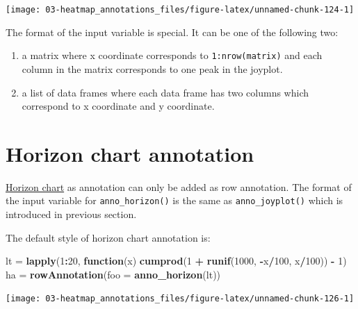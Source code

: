 \documentclass[]{book}
\newenvironment{Shaded}{\begin{snugshade}}{\end{snugshade}}
\newcommand{\KeywordTok}[1]{\textcolor[rgb]{0.13,0.29,0.53}{\textbf{#1}}}
\newcommand{\DataTypeTok}[1]{\textcolor[rgb]{0.13,0.29,0.53}{#1}}
\newcommand{\DecValTok}[1]{\textcolor[rgb]{0.00,0.00,0.81}{#1}}
\newcommand{\StringTok}[1]{\textcolor[rgb]{0.31,0.60,0.02}{#1}}
\newcommand{\ControlFlowTok}[1]{\textcolor[rgb]{0.13,0.29,0.53}{\textbf{#1}}}
\newcommand{\OperatorTok}[1]{\textcolor[rgb]{0.81,0.36,0.00}{\textbf{#1}}}
\newcommand{\NormalTok}[1]{#1}
\providecommand{\tightlist}{%
  \setlength{\itemsep}{0pt}\setlength{\parskip}{0pt}}
\theoremstyle{definition}
\theoremstyle{definition}
\theoremstyle{definition}
\theoremstyle{remark}
\begin{document}
\begin{center}\texttt{[image: 03-heatmap\_annotations\_files/figure-latex/unnamed-chunk-124-1]} \end{center}

The format of the input variable is special. It can be one of the
following two:

\begin{enumerate}
\def\labelenumi{\arabic{enumi}.}
\tightlist
\item
  a matrix where x coordinate corresponds to \texttt{1:nrow(matrix)} and
  each column in the matrix corresponds to one peak in the joyplot.
\item
  a list of data frames where each data frame has two columns which
  correspond to x coordinate and y coordinate.
\end{enumerate}

\section{Horizon chart annotation}\label{horizon-chart-annotation}

\href{https://flowingdata.com/2015/07/02/changing-price-of-food-items-and-horizon-graphs/}{Horizon
chart} as annotation can only be added as row annotation. The format of
the input variable for \texttt{anno\_horizon()} is the same as
\texttt{anno\_joyplot()} which is introduced in previous section.

The default style of horizon chart annotation is:

\begin{Shaded}
\begin{Highlighting}[]
\NormalTok{lt =}\StringTok{ }\KeywordTok{lapply}\NormalTok{(}\DecValTok{1}\OperatorTok{:}\DecValTok{20}\NormalTok{, }\ControlFlowTok{function}\NormalTok{(x) }\KeywordTok{cumprod}\NormalTok{(}\DecValTok{1} \OperatorTok{+}\StringTok{ }\KeywordTok{runif}\NormalTok{(}\DecValTok{1000}\NormalTok{, }\OperatorTok{-}\NormalTok{x}\OperatorTok{/}\DecValTok{100}\NormalTok{, x}\OperatorTok{/}\DecValTok{100}\NormalTok{)) }\OperatorTok{-}\StringTok{ }\DecValTok{1}\NormalTok{)}
\NormalTok{ha =}\StringTok{ }\KeywordTok{rowAnnotation}\NormalTok{(}\DataTypeTok{foo =} \KeywordTok{anno_horizon}\NormalTok{(lt))}
\end{Highlighting}
\end{Shaded}

\begin{center}\texttt{[image: 03-heatmap\_annotations\_files/figure-latex/unnamed-chunk-126-1]} \end{center}
\end{document}
